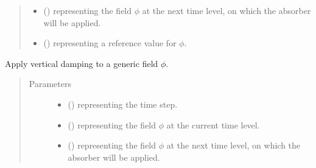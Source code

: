 \documentclass[letterpaper,10pt,english]{sphinxmanual}
\begin{document}
\begin{fulllineitems}
\begin{fulllineitems}
\begin{quote}
\begin{description}
\begin{itemize}
\item {} 
 () \textendash{}  representing the field \(\phi\) at the next time level, on
which the absorber will be applied.

\item {} 
 () \textendash{}  representing a reference value for \(\phi\).

\end{itemize}

\end{description}\end{quote}

\end{fulllineitems}


\begin{fulllineitems}
\label{\detokenize{api:dycore.vertical_damping.VerticalDampingRayleigh.apply}}
Apply vertical damping to a generic field \(\phi\).
\begin{quote}\begin{description}
\item[{Parameters}] \leavevmode\begin{itemize}
\item {} 
 () \textendash{}  representing the time step.

\item {} 
 () \textendash{}  representing the field \(\phi\) at the current time level.

\item {} 
 () \textendash{}  representing the field \(\phi\) at the next time level, on
which the absorber will be applied.


\end{itemize}
\end{description}
\end{quote}
\end{fulllineitems}
\end{fulllineitems}
\end{document}
